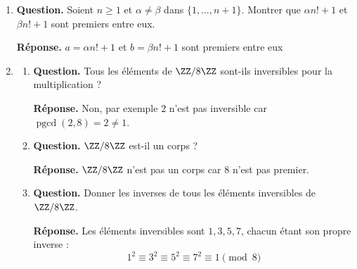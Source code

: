 \documentclass[12pt, a4paper]{article}
\begin{document}
\begin{enumerate}[label=2.\arabic*., start=17]
  \item \begin{minipage}[t]{\linewidth}\raggedright
\textbf{Question.} Soient $n\geq1$ et $\alpha\neq\beta$ dans $\{1,\ldots,n+1\}$. Montrer que $\alpha n!+1$ et $\beta n!+1$ sont premiers entre eux.
\par\smallskip
\textbf{Réponse.} $a = \alpha n! + 1$ et $b = \beta n! + 1$ sont premiers entre eux
\end{minipage}

  \item \begin{minipage}[t]{\linewidth}\raggedright
\begin{enumerate}[\arabic*.]
        \item \textbf{Question.} Tous les éléments de $\ZZ/8\ZZ$ sont-ils inversibles pour la multiplication ?
\par\smallskip
\textbf{Réponse.} Non, par exemple $2$ n'est pas inversible car $\operatorname{pgcd}(2,8) = 2 \neq 1$.

  \item \textbf{Question.} $\ZZ/8\ZZ$ est-il un corps ?
\par\smallskip
\textbf{Réponse.} $\ZZ/8\ZZ$ n'est pas un corps car $8$ n'est pas premier.

  \item \textbf{Question.} Donner les inverses de tous les éléments inversibles de $\ZZ/8\ZZ$.
\par\smallskip
\textbf{Réponse.} Les éléments inversibles sont $1, 3, 5, 7$, chacun étant son propre inverse :
        \[
          1^2 \equiv 3^2 \equiv 5^2 \equiv 7^2 \equiv 1 \pmod 8
        \]

\end{enumerate}
\end{minipage}


\end{enumerate}
\end{document}
